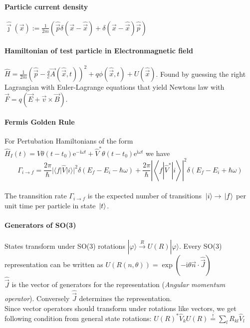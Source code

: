 \paragraph{Particle current density} $\hat{\vec{\jmath}}(\vec{x}):=\frac{1}{2 m}(\hat{\vec{p}} \delta(\vec{x}-\hat{\vec{x}})+\delta(\vec{x}-\hat{\vec{x}}) \hat{\vec{p}}) $

\paragraph{Hamiltonian of test particle in Electronmagnetic field} $\hat{H}=\frac{1}{2 m}\left(\hat{\vec{p}}-\frac{q}{c} \vec{A}(\hat{\vec{x}}, t)\right)^2+q \phi(\hat{\vec{x}}, t)+U(\hat{\vec{x}} )$.
Found by guessing the right Lagrangian with Euler-Lagrange equations that yield Newtons law with $\vec{F}=q(\vec{E}+\vec{v} \times \vec{B})$.

\paragraph{Fermis Golden Rule} For Pertubation Hamiltonians of the form $\hat{H}_I(t)=\hat{V} \theta\left(t-t_0\right) \mathrm{e}^{-\mathrm{i} \omega t}+\hat{V}^* \theta\left(t-t_0\right) \mathrm{e}^{\mathrm{i} \omega t}$
we have $$\Gamma_{i \rightarrow f}=\frac{2 \pi}{\hbar}|\langle f|\hat{V}| i\rangle|^2 \delta\left(E_f-E_i-\hbar \omega\right)+\frac{2 \pi}{\hbar}\left|\left\langle f\left|\hat{V}^*\right| i\right\rangle\right|^2 \delta\left(E_f-E_i+\hbar \omega\right)$$\\
The trannsition rate $\Gamma_{i \rightarrow f}$ is the expected number of transitions $\ket*{i} \rightarrow \ket*{f}$ per unit time per particle in state $\ket*{t}$. 

\paragraph{Generators of SO(3)} States transform under SO(3) rotations $|\varphi\rangle \stackrel{R}{\rightarrow} U(R)|\varphi\rangle$. Every SO(3) representation can be written as $U(R(n, \theta))=\exp (-\mathrm{i} \theta \vec{n} \cdot \hat{\vec{J}})$\\
$ \hat{\vec{J}}$ is the vector of generators for the representation (\emph{Angular momentum operator}). Conversely $\hat{\vec{J}}$ determines the representation.\\
Since vector operators should transform under rotations like vectors, we get following condition from general state rotations: $U(R)^* \hat{V}_k U(R) \stackrel{!}{=} \sum_l R_{k l} \hat{V}_l$


